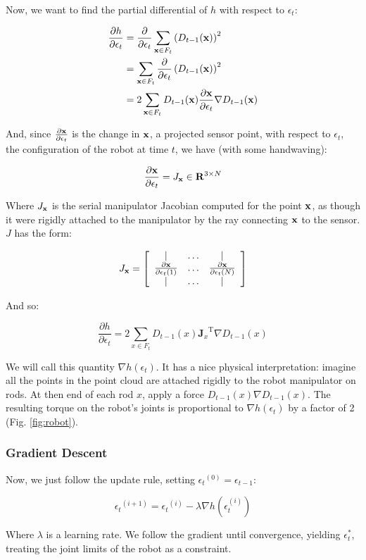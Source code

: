 \documentclass{article}
\begin{document}
Now, we want to find the partial differential of $h$ with respect to
$\epsilon_t$:


\begin{align} 
\frac{\partial{h}}{\partial{\epsilon_t}} &= \frac{\partial}{\partial \epsilon_t}  \sum_{\mathbf{x} \in F_t}\left(D_{t-1}(\mathbf{x})\right) ^2 \\
 &= \sum_{\mathbf{x} \in F_t} \frac{\partial}{\partial \epsilon_t} \left(D_{t-1}(\mathbf{x})\right) ^2 \\ 
 &= 2\sum_{\mathbf{x} \in F_t} D_{t-1}(\mathbf{x}) \frac{\partial \mathbf{x}}{\partial \epsilon_t} \nabla D_{t-1}(\mathbf{x})
\end{align} 

And, since $\frac{\partial \mathbf{x}}{\partial \epsilon_t}$ is the change in $\mathbf{x}$, a projected sensor point, with
respect to $\epsilon_t$, the configuration of the robot at time $t$, we have (with some
handwaving):

$$ \frac{\partial \mathbf{x}}{\partial \epsilon_t} = J_{\mathbf{x}} \in \mathbf{R}^{3 \times N}$$

Where $J_{\mathbf{x}}$ is the serial manipulator Jacobian computed for
the point $\mathbf{x}$, as though it were rigidly attached to the manipulator by
the ray connecting $\mathbf{x}$ to the sensor. $J$ has the form:

\begin{equation} J_{\mathbf{x}} = \left[
\begin{array}{ccc}
| & \ldots & | \\
\frac{\partial \mathbf{x}}{\partial \epsilon_t(1)} & \ldots & \frac{\partial
\mathbf{x}}{\partial \epsilon_t(N)}  \\
| & \ldots & |
\end{array}
\right]
\end{equation}

\noindent And so:

$$ \frac{\partial{h}}{\partial{\epsilon_t}} = 2\sum_{x \in F_t} D_{t-1}(x)
{\mathbf{J}_x}^{\text{T}} \nabla D_{t-1}(x) $$

\noindent We will call this quantity $\nabla h(\epsilon_t)$. It has a nice physical
interpretation: imagine all the points in the point cloud are attached rigidly
to the robot manipulator on rods. At then end of each rod $x$, apply a force
$D_{t - 1}(x) \nabla D_{t -1} (x)$. The resulting torque on the robot's joints 
is proportional to $\nabla h(\epsilon_t)$ by a factor of 2 (Fig. \ref{fig:robot}).

\subsubsection{Gradient Descent}

Now, we just follow the update rule, setting ${\epsilon_t}^{(0)} =
\epsilon_{t - 1}$:

$$ {\epsilon_t}^{(i + 1)} = {\epsilon_t}^{(i)} - \lambda \nabla
h(\epsilon_t^{(i)}) $$

\noindent Where $\lambda$ is a learning rate. We follow the gradient until
convergence, yielding $\epsilon^*_t$, treating the joint limits of the robot as
a constraint.
\end{document}
